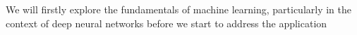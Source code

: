 We will firstly explore the fundamentals of machine learning, particularly in the context of deep neural networks before we start to address the application 